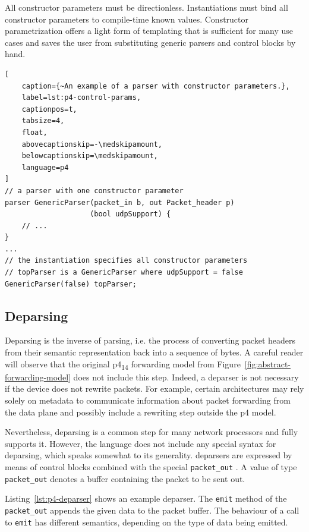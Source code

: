 All constructor parameters must be directionless. Instantiations must bind all
constructor parameters to compile-time known values. Constructor parametrization
offers a light form of templating that is sufficient for many use cases and
saves the user from substituting generic parsers and control blocks by hand.

\begin{lstlisting}[
	caption={~An example of a parser with constructor parameters.},
	label=lst:p4-control-params,
	captionpos=t,
	tabsize=4,
	float,
	abovecaptionskip=-\medskipamount,
	belowcaptionskip=\medskipamount,
	language=p4
]
// a parser with one constructor parameter
parser GenericParser(packet_in b, out Packet_header p)
                    (bool udpSupport) {
	// ...
}
...
// the instantiation specifies all constructor parameters
// topParser is a GenericParser where udpSupport = false
GenericParser(false) topParser;
\end{lstlisting}

\subsection*{Deparsing} \label{sec:p4-deparsing}

Deparsing is the inverse of parsing, i.e. the process of converting packet
headers from their semantic representation back into a sequence of bytes. A
careful reader will observe that the original \acrshort{p4}\textsubscript{14}
forwarding model from Figure~\ref{fig:abstract-forwarding-model} does not
include this step. Indeed, a deparser is not necessary if the device does not
rewrite packets. For example, certain architectures may rely solely on metadata
to communicate information about packet forwarding from the data plane and
possibly include a rewriting step outside the \acrshort{p4} model.

Nevertheless, deparsing is a common step for many network processors and \pfs
fully supports it. However, the language does not include any special syntax for
deparsing, which speaks somewhat to its generality. \pfs deparsers are expressed
by means of control blocks combined with the special \texttt{packet\_out}
\extern. A value of type \texttt{packet\_out} denotes a buffer containing the
packet to be sent out.

Listing~\ref{lst:p4-deparser} shows an example deparser. The \texttt{emit}
method of the \texttt{packet\_out} \extern{} appends the given data to the
packet buffer. The behaviour of a call to \texttt{emit} has different semantics,
depending on the type of data being emitted.

